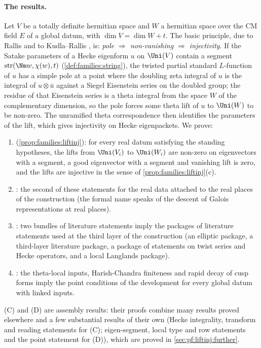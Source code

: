 \paragraph{The results.}
Let $V$ be a totally definite hermitian space and $W$ a hermitian space over the CM field $E$ of a global datum,
with $\dim V=\dim W+t$. The basic principle, due to Rallis and to Kudla--Rallis
\cite{Rallis1984inj,KudlaRallis1994,Yamana2014,GanQiuTakeda2014}, is:
\emph{pole $\Rightarrow$ non-vanishing $\Rightarrow$ injectivity}. If the Satake parameters of a Hecke eigenform
$u$ on $\Uni(V)$ contain a segment $\liftinjstr(\Nm w,\chi(w),t)$ (\cref{def:families:string}), the twisted
partial standard $L$-function of $u$ has a simple pole at a point where the doubling zeta integral of $u$ is
the integral of $u\otimes\bar u$ against a Siegel Eisenstein series on the doubled group; the residue of that
Eisenstein series is a theta integral from the space $W$ of the complementary dimension, so the pole forces
some theta lift of $u$ to $\Uni(W)$ to be non-zero. The unramified theta correspondence then identifies the
parameters of the lift, which gives injectivity on Hecke eigenpackets. We prove:
\begin{enumerate}[label=(\Alph*)]
\item {} (\cref{prop:families:liftinj}): for every real datum satisfying the standing
hypotheses, the lifts from $\Uni(V_i)$ to $\Uni(W_i)$ are non-zero on eigenvectors with a segment, a good
eigenvector with a segment and vanishing lift is zero, and the lifts are injective in the sense of
\cref{prop:families:liftinj}(c).
\item {}: the second of these statements for the real data attached to the real places of the
construction (the formal name speaks of the descent of Galois representations at real places).
\item {}: two bundles of literature statements imply the packages of literature statements used at
the third layer of the construction (an elliptic package, a third-layer literature package, a package of statements on
twist series and Hecke operators, and a local Langlands package).
\item {}: the theta-local inputs, Harish-Chandra finiteness and rapid decay of cusp forms
imply the point conditions of the development for every global datum with linked inputs.
\end{enumerate}
(C) and (D) are assembly results: their proofs combine many results proved elsewhere and a few substantial
results of their own (Hecke integrality, transform and reading statements for (C); eigen-segment, local type and
row statements and the point statement for (D)), which are proved in \cref{sec:pf:liftinj:further}.

